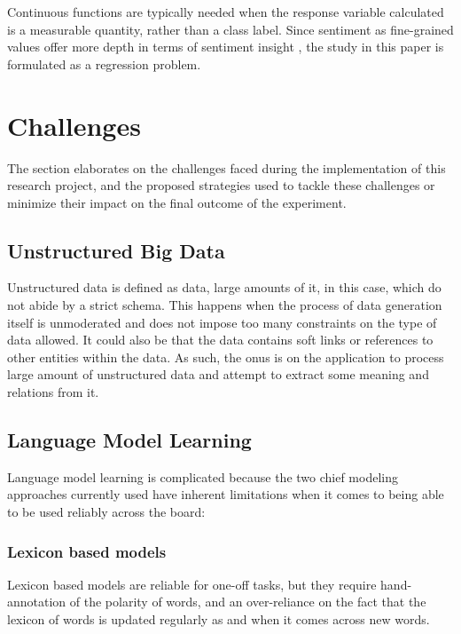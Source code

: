 \documentclass[conference]{IEEEtran}
\begin{document}
        Continuous functions are typically needed when the response variable calculated is a measurable quantity, rather than a class label. Since sentiment as fine-grained values offer more depth in terms of sentiment insight \cite{drake2008sentiment}, the study in this paper is formulated as a regression problem.

\vspace{5mm}

\section{Challenges}
    The section elaborates on the challenges faced during the implementation of this research project, and the proposed strategies used to tackle these challenges or minimize their impact on the final outcome of the experiment.

    \subsection{Unstructured Big Data}
        Unstructured data is defined as data, large amounts of it, in this case, which do not abide by a strict schema\cite{buneman1996query}. This happens when the process of data generation itself is unmoderated and does not impose too many constraints on the type of data allowed. It could also be that the data contains soft links or references to other entities within the data. As such, the onus is on the application to process large amount of unstructured data and attempt to extract some meaning and relations from it.

    \subsection{Language Model Learning}
        Language model learning is complicated because the two chief modeling approaches currently used have inherent limitations when it comes to being able to be used reliably across the board:
        
        \subsubsection{Lexicon based models}
        Lexicon based models are reliable for one-off tasks, but they require hand-annotation of the polarity of words, and an over-reliance on the fact that the lexicon of words is updated regularly as and when it comes across new words.
\end{document}
